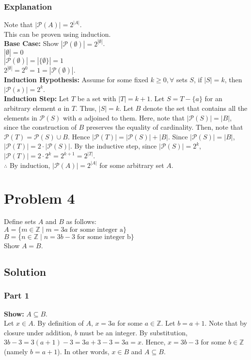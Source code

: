 \documentclass[table]{article}
\begin{document}
\subsubsection{Explanation}
Note that $|\mathcal{P}(A)| = 2^{|A|}$.\\
This can be proven using induction.\\
\textbf{Base Case:} Show $|\mathcal{P}(\emptyset)|=2^{|\emptyset|}$.\\
$|\emptyset|=0$\\
$|\mathcal{P}(\emptyset)| = |\{\emptyset\}| = 1$\\
$2^{|\emptyset|} = 2^0 = 1 = |\mathcal{P}(\emptyset)|$.\\
\textbf{Induction Hypothesis:} Assume for some fixed $k \geq 0, \forall$ sets $S$, if $|S|=k$, then $|\mathcal{P}(s)|=2^k$.\\
\textbf{Induction Step:} Let $T$ be a set with $|T| = k+1$. Let $S = T - \{a\}$ for an arbitrary element $a$ in $T$. Thus, $|S| = k$. Let $B$ denote the set that contains all the elements in $\mathcal{P}(S)$ with $a$ adjoined to them. Here, note that $|\mathcal{P}(S)| = |B|$, since the construction of $B$ preserves the equality of cardinality. Then, note that $\mathcal{P}(T) = \mathcal{P}(S) \cup B$. Hence $|\mathcal{P}(T)| = |\mathcal{P}(S)| + |B|$. Since $|\mathcal{P}(S)| = |B|$, $|\mathcal{P}(T)| = 2 \cdot |\mathcal{P}(S)|$. By the inductive step, since $|\mathcal{P}(S)| = 2^k$, $|\mathcal{P}(T)| = 2 \cdot 2^k = 2^{k+1} = 2^{|T|}$.\\
$\therefore$ By induction, $|\mathcal{P}(A)| = 2^{|A|}$ for some arbitrary set $A$.
\section{Problem 4}
Define sets $A$ and $B$ as follows:\\
\indent $A = \{m \in \mathbb{Z} \mid m = 3a \;\text{for some integer a}\}$\\
\indent $B = \{n \in \mathbb{Z} \mid n = 3b - 3 \;\text{for some integer b}\}$\\
Show $A = B$.
\subsection{Solution}
\subsubsection{Part 1}
\textbf{Show:} $A \subseteq B$.\\
Let $x \in A$. By definition of $A$, $x = 3a$ for some $a \in \mathbb{Z}$. Let $b = a + 1$. Note that by closure under addition, $b$ must be an integer. By substitution, $3b - 3 = 3(a + 1) - 3 = 3a + 3 - 3 = 3a = x$. Hence, $x = 3b - 3$ for some $b \in \mathbb{Z}$ (namely $b = a + 1$). In other words, $x \in B$ and $A \subseteq B$.
\end{document}
